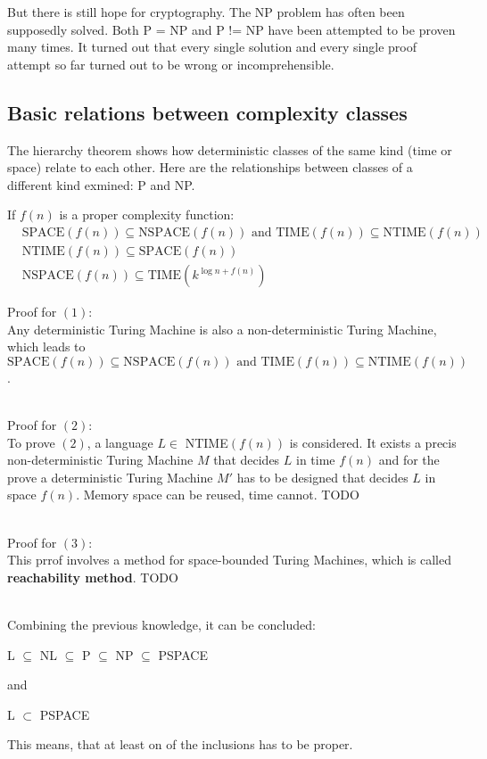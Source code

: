 \documentclass[a4]{scrartcl}
\begin{document}
But there is still hope for cryptography. The NP problem has often been supposedly solved. Both P = NP and P != NP have been attempted to be proven many times. It turned out that every single solution and every single proof attempt so far turned out to be wrong or incomprehensible. \cite{DD, book, GTI}






\subsection*{Basic relations between complexity classes}


The hierarchy theorem shows how deterministic classes of the same kind (time or space) relate to each other.
Here are the relationships between classes of a different kind exmined: P and NP.

If $f(n)$ is a proper complexity function:
\begin{align}
& \text{SPACE}(f(n)) \subseteq \text{NSPACE}(f(n)) \text{ and TIME}(f(n)) \subseteq \text{NTIME}(f(n)) \\
& \text{NTIME}(f(n)) \subseteq \text{SPACE}(f(n)) \\
& \text{NSPACE}(f(n)) \subseteq \text{TIME}(k^{\log n + f(n)}) 
\end{align}

Proof for $(1)$: \\
Any deterministic Turing Machine is also a non-deterministic Turing Machine, which leads to $\text{SPACE}(f(n)) \subseteq \text{NSPACE}(f(n)) \text{ and TIME}(f(n)) \subseteq \text{NTIME}(f(n))$.

\ \\
Proof for $(2)$: \\
To prove $(2)$, a language $L \in $ NTIME$(f(n))$ is considered. It exists a precis non-deterministic Turing Machine $M$ that decides $L$ in time $f(n)$ and for the prove a deterministic Turing Machine $M'$ has to be designed that decides $L$ in space $f(n)$.
Memory space can be reused, time cannot.
\color{red} TODO
\color{black}

\ \\
Proof for $(3)$: \\
This prrof involves a method for space-bounded Turing Machines, which is called \textbf{reachability method}.
\color{red} TODO
\color{black}

\ \\
Combining the previous knowledge, it can be concluded:
\begin{center}
L $\subseteq$ NL $\subseteq$ P $\subseteq$ NP $\subseteq$ PSPACE
\end{center}
and
\begin{center}
L $\subset$ PSPACE
\end{center}
This means, that at least on of the inclusions has to be proper.
\end{document}
